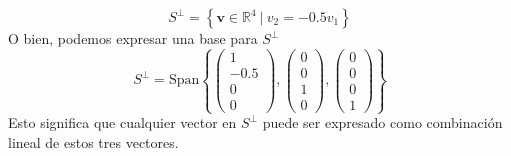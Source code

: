 \begin{solution}
\[
S^\perp = \left\{ \mathbf{v} \in \mathbb{R}^4 \ \bigg| \ v_2 = -0.5v_1 \right\}
\]
O bien, podemos expresar una base para \( S^\perp \)
\[
S^\perp = \text{Span} \left\{ \begin{pmatrix} 1 \\ -0.5 \\ 0 \\ 0 \end{pmatrix}, \begin{pmatrix} 0 \\ 0 \\ 1 \\ 0 \end{pmatrix}, \begin{pmatrix} 0 \\ 0 \\ 0 \\ 1 \end{pmatrix} \right\}
\]
Esto significa que cualquier vector en \( S^\perp \) puede ser expresado como combinación lineal de estos tres vectores.

\end{solution}